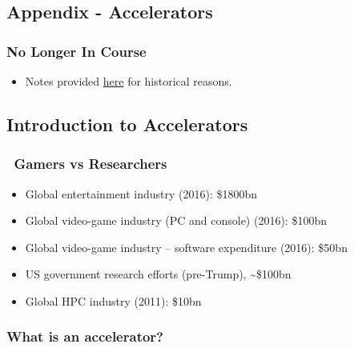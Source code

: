 \subsection{Appendix - Accelerators}\label{appendix---accelerators-1}

\subsubsection{No Longer In Course}\label{no-longer-in-course-4}

\begin{itemize}
\itemsep1pt\parskip0pt
\item
  Notes provided \href{sec01Index}{here} for historical reasons.
\end{itemize}

\subsection{Introduction to
Accelerators}\label{introduction-to-accelerators}

\subsubsection{~Gamers vs Researchers}\label{gamers-vs-researchers}

\begin{itemize}
\itemsep1pt\parskip0pt
\item
  Global entertainment industry (2016): \$1800bn
\item
  Global video-game industry (PC and console) (2016): \$100bn
\item
  Global video-game industry -- software expenditure (2016): \$50bn
\item
  US government research efforts (pre-Trump), \textasciitilde{}\$100bn
\item
  Global HPC industry (2011): \$10bn
\end{itemize}

\subsubsection{What is an accelerator?}\label{what-is-an-accelerator}

